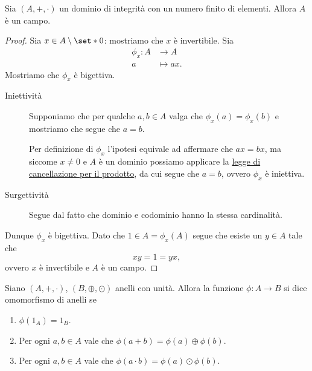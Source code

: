 \begin{proposition}
    Sia $(A, +, \cdot)$ un dominio di integrità con un numero finito di elementi. Allora $A$ è un campo.
\end{proposition}
\begin{proof}
    Sia $x \in A \setminus \set*{0}$: mostriamo che $x$ è invertibile.
    Sia \begin{align*}
        \phi_x : A &\to A\\
        a &\mapsto ax.
    \end{align*} Mostriamo che $\phi_x$ è bigettiva.
    
    \begin{description}
        \item[Iniettività] Supponiamo che per qualche $a, b \in A$ valga che $\phi_x(a) = \phi_x(b)$ e mostriamo che segue che $a = b$.

        Per definizione di $\phi_x$ l'ipotesi equivale ad affermare che $ax = bx$, ma siccome $x \neq 0$ e $A$ è un dominio possiamo applicare la \hyperref[cor:canc_prod_dominio]{legge di cancellazione per il prodotto}, da cui segue che $a = b$, ovvero $\phi_x$ è iniettiva.
        \item[Surgettività] Segue dal fatto che dominio e codominio hanno la stessa cardinalità.
    \end{description}

    Dunque $\phi_x$ è bigettiva. Dato che $1 \in A = \phi_x(A)$ segue che esiste un $y \in A$ tale che \[
        xy = 1 = yx, 
    \] ovvero $x$ è invertibile e $A$ è un campo.
\end{proof}

\begin{definition}
     \label{def:omo_anelli}
    Siano $(A, +, \cdot)$, $(B, \oplus, \odot)$ anelli con unità. Allora la funzione $\phi : A \to B$ si dice omomorfismo di anelli se \begin{enumerate}[label={(\roman*)}]
        \item $\phi(1_A) = 1_B$.
        \item Per ogni $a, b \in A$ vale che $\phi(a + b) = \phi(a) \oplus \phi(b)$.
        \item Per ogni $a, b \in A$ vale che $\phi(a \cdot b) = \phi(a) \odot \phi(b)$.
    \end{enumerate}
\end{definition}